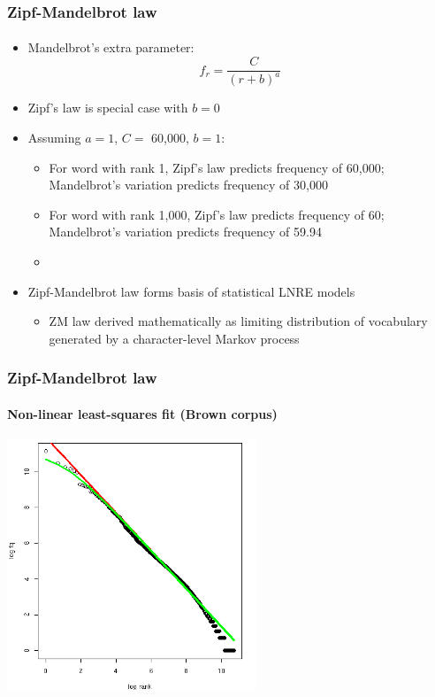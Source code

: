 \documentclass[t]{beamer} %
\begin{document}
\begin{frame}
  \frametitle{Zipf-Mandelbrot law}
  \framesubtitle{\citet{Mandelbrot:53,Mandelbrot:62}}

  \begin{itemize}
    \item Mandelbrot's extra parameter:
    \[
    f_r = \frac{C}{(r + b)^a}
    \]
  \item Zipf's law is special case with $b=0$
  \item<2-> Assuming $a=1$, $C=$ 60,000, $b=1$:
    \begin{itemize}
    \item For word with rank 1, Zipf's law predicts frequency of
      60,000; Mandelbrot's variation predicts frequency of 30,000
    \item For word with rank 1,000,  Zipf's law predicts frequency of
      60; Mandelbrot's variation predicts frequency of 59.94
    \item[]
    \end{itemize}
  \item<3-> Zipf-Mandelbrot law forms basis of statistical LNRE models%
    \begin{itemize}
    \item ZM law derived mathematically as limiting distribution of
      vocabulary generated by a character-level Markov process
    \end{itemize}
  \end{itemize}
\end{frame}

\begin{frame}
  \frametitle{Zipf-Mandelbrot law} 
  \framesubtitle{Non-linear least-squares fit (Brown corpus)}

  \ungap[1.5]
  \begin{center}
    \includegraphics[height=7.5cm]{img/brown-zipf-man-rf}
  \end{center}
\end{frame}
\end{document}
